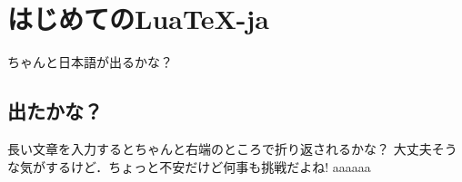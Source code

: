 \documentclass[a4,15pt,landscape,twocolumn]{ltjsarticle}
\begin{document}
\section{はじめてのLua\TeX-ja}
ちゃんと日本語が出るかな？
\subsection{出たかな？}
長い文章を入力するとちゃんと右端のところで折り返されるかな？
大丈夫そうな気がするけど．ちょっと不安だけど何事も挑戦だよね!
\newpage
aaaaaa

\end{document}
